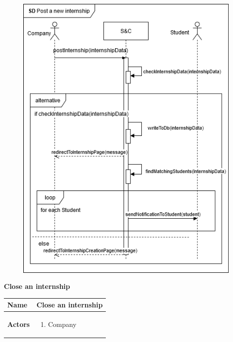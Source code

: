 \begin{enumerate}[label=\textbf{[US\arabic*]}, left = 0pt, align = left, resume]
\begin{longtable}{|l|p{11cm}|}
            \end{longtable}

            \newpage
            \begin{figure}[h!]
                \centering  \includegraphics[width=1\textwidth]{RASD/Images/UseCases/US09_PostNewInternship.drawio.png}
                \label{fig:example}
            \end{figure}

            \newpage
            \item \textbf{Close an internship}
            
            \begin{longtable}{|l|p{11cm}|}  
                \hline
                \textbf{Name} & 
                    \textbf{Close an internship} \\
                \hline
                
                \textbf{Actors} & 
                    \begin{enumerate}[label=\textbullet, itemsep=0em]
                        \item Company
                    \end{enumerate} \\
                \hline
                

\end{longtable}
\end{enumerate}
